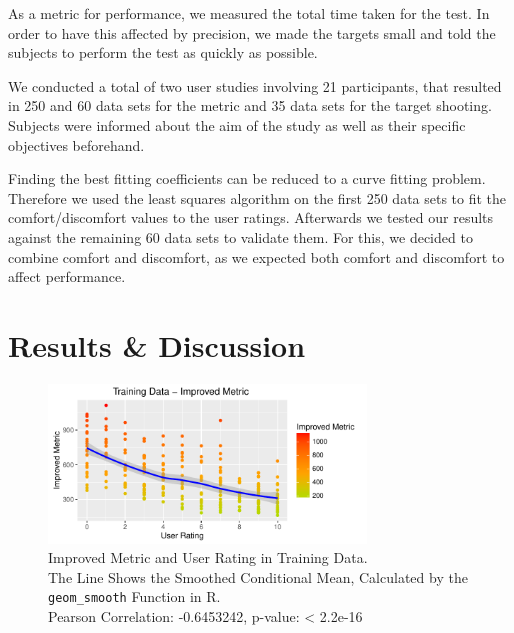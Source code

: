 \documentclass{sig-alternate-05-2015}
\begin{document}
As a metric for performance, we measured the total time taken for the test. In order to have this affected by precision, we made the targets small and told the subjects to perform the test as quickly as possible.

We conducted a total of two user studies involving 21 participants, that resulted in 250 and 60 data sets for the metric and 35 data sets for the target shooting. Subjects were informed about the aim of the study as well as their specific objectives beforehand.

Finding the best fitting coefficients can be reduced to a curve fitting problem. Therefore we used the least squares algorithm on the first 250 data sets to fit the comfort/discomfort values to the user ratings. Afterwards we tested our results against the remaining 60 data sets to validate them. For this, we decided to combine comfort and discomfort, as we expected both comfort and discomfort to affect performance.

\section{Results \& Discussion}

\begin{figure}[b]
\centering
\includegraphics[width=8.45cm]{TrainingDataImproved}
\vspace{-20pt}
\caption{Improved Metric and User Rating in Training Data. \\
The Line Shows the Smoothed Conditional Mean, Calculated by the \texttt{geom\_smooth} Function in R. \\
Pearson Correlation: -0.6453242, p-value: < 2.2e-16}
\label{fig:trainingData}
\vspace{-10pt}
\end{figure}
\end{document}
